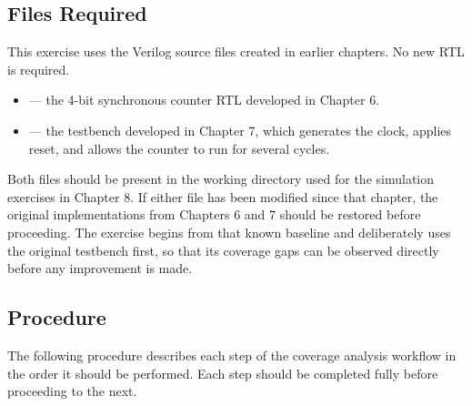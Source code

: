 \subsection{Files Required}

This exercise uses the Verilog source files created in earlier chapters. No new RTL is required.

\begin{itemize}
    \item {} — the 4-bit synchronous counter RTL developed in Chapter 6.
    \item {} — the testbench developed in Chapter 7, which generates the clock, applies reset, and allows the counter to run for several cycles.
\end{itemize}

Both files should be present in the working directory used for the simulation exercises in Chapter 8. If either file has been modified since that chapter, the original implementations from Chapters 6 and 7 should be restored before proceeding. The exercise begins from that known baseline and deliberately uses the original testbench first, so that its coverage gaps can be observed directly before any improvement is made.\

\subsection{Procedure}

The following procedure describes each step of the coverage analysis workflow in the order it should be performed. Each step should be completed fully before proceeding to the next.

